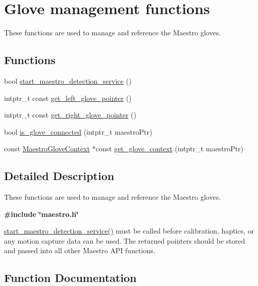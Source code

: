 \hypertarget{group__glove_management}{}\section{Glove management functions}
\label{group__glove_management}


These functions are used to manage and reference the Maestro gloves.  


\subsection*{Functions}
\begin{DoxyCompactItemize}
\item 
bool \hyperlink{group__glove_management_ga10088517f643220611dfcd5da08bfaa1}{start\+\_\+maestro\+\_\+detection\+\_\+service} ()
\item 
intptr\+\_\+t const \hyperlink{group__glove_management_ga63ce3c99d4a8b8db851b22af9185764e}{get\+\_\+left\+\_\+glove\+\_\+pointer} ()
\item 
intptr\+\_\+t const \hyperlink{group__glove_management_ga9b8fd9d91aeac3f8da50f7a7eba0c32b}{get\+\_\+right\+\_\+glove\+\_\+pointer} ()
\item 
bool \hyperlink{group__glove_management_ga85666868951331c5266df7559abeefbc}{is\+\_\+glove\+\_\+connected} (intptr\+\_\+t maestro\+Ptr)
\item 
const \hyperlink{struct_maestro_glove_context}{Maestro\+Glove\+Context} $\ast$const \hyperlink{group__glove_management_gab83c1dd0e2c4ba3073b928b76174e2a5}{get\+\_\+glove\+\_\+context} (intptr\+\_\+t maestro\+Ptr)
\end{DoxyCompactItemize}


\subsection{Detailed Description}
These functions are used to manage and reference the Maestro gloves. 

{\bfseries {\ttfamily \#include \char`\"{}maestro.\+h\char`\"{}}}

{\ttfamily \hyperlink{group__glove_management_ga10088517f643220611dfcd5da08bfaa1}{start\+\_\+maestro\+\_\+detection\+\_\+service()}} must be called before calibration, haptics, or any motion capture data can be used. The returned pointers should be stored and passed into all other Maestro A\+PI functions. 

\subsection{Function Documentation}
\mbox{\label{group__glove_management_gab83c1dd0e2c4ba3073b928b76174e2a5}} 
